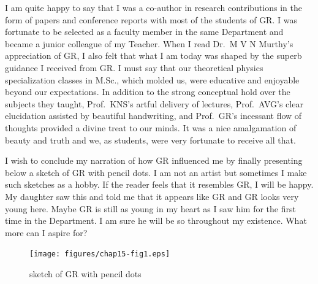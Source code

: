 I am quite happy to say that I was a co-author in research contributions in the form of papers and conference reports with most of the students of GR. I was fortunate to be selected as a faculty member in the same Department and became a junior colleague of my Teacher. When I read Dr.\ M V N Murthy's appreciation of GR, I also felt that what I am today was shaped by the superb guidance I received from GR. I must say that our theoretical physics specialization classes in M.Sc., which molded us, were educative and enjoyable beyond our expectations. In addition to the strong conceptual hold over the subjects they taught, Prof.\ KNS's artful delivery of lectures, Prof.\ AVG's clear elucidation assisted by beautiful handwriting, and Prof.\ GR's incessant flow of thoughts provided a divine treat to our minds. It was a nice amalgamation of beauty and truth and we, as students, were very fortunate to receive all that.

I wish to conclude my narration of how GR influenced me by finally presenting below a sketch of GR with pencil dots. I am not an artist but sometimes I make such sketches as a hobby. If the reader feels that it resembles GR, I will be happy. My daughter saw this and told me that it appears like GR and GR looks very young here. Maybe GR is still as young in my heart as I saw him for the first time in the Department. I am sure he will be so throughout my existence. What more can I aspire for?

\begin{figure}[H]
\centering
\texttt{[image: figures/chap15-fig1.eps]}
\caption{sketch of GR with pencil dots}
\end{figure}
\vskip 0.5cm


